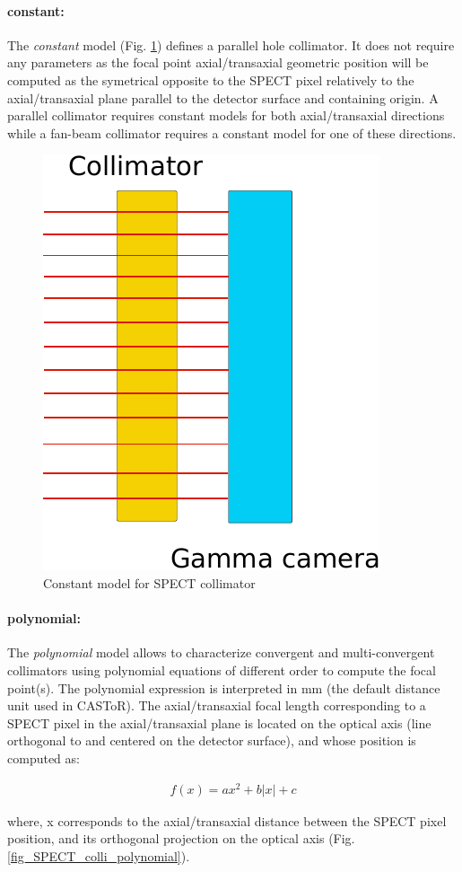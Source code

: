 \documentclass[a4paper, 11pt]{article}
\begin{document}
\paragraph{constant:}

The \textit{constant} model (Fig. \ref{fig_SPECT_colli_constant}) defines a parallel hole collimator. It does not require any parameters as
the focal point axial/transaxial geometric position will be computed as the symetrical opposite to the SPECT pixel relatively to the axial/transaxial plane parallel to the detector surface and containing origin. A parallel collimator requires constant models for both axial/transaxial directions while a fan-beam collimator requires a constant model for one of these directions.

\begin{figure} [h]
  \centering
  \includegraphics[width=0.23\columnwidth]{./figures/spect_colli_parallel.pdf}
  \caption{Constant model for SPECT collimator}
  \label{fig_SPECT_colli_constant}
\end{figure}

\paragraph{polynomial:}

The \textit{polynomial} model allows to characterize convergent and multi-convergent collimators using
polynomial equations of different order to compute the focal point(s). The polynomial expression is interpreted in mm (the default distance
unit used in CASToR). The axial/transaxial focal length corresponding to a SPECT pixel in the axial/transaxial plane is located on the optical axis (line orthogonal to and centered on the detector surface), and whose position is computed as:

\begin{equation}
\begin{aligned}
f(x) = ax^2 + b|x| + c
\end{aligned}
\label{eq_sss_SPECT_colli_pol0}
\end{equation}

where, x corresponds to the axial/transaxial distance between the SPECT pixel position, and its orthogonal projection on the optical axis (Fig. \ref{fig_SPECT_colli_polynomial}).
\end{document}
